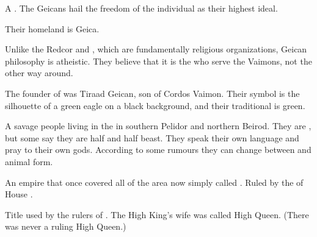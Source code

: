 \begin{gloss}
\begin{subgloss}
  \begin{comment}
  \subparagraph{Geican}
  \end{comment}
  A \VaimonClan. 
  The Geicans hail the freedom of the individual as their highest ideal. 
  
  Their homeland is Geica.
  
  Unlike the Redcor and \Telcra, which are fundamentally religious organizations, Geican philosophy is atheistic. 
  They believe that it is the \Archons{} who serve the Vaimons, not the other way around. 
  
  The founder of \ClanGeican was Tiraad Geican, son of Cordos Vaimon. 
  Their symbol is the silhouette of a green eagle on a black background, and their traditional \colour is green. 
\end{subgloss}







\begin{comment}
\paragraph{\Goyden}
\end{comment}
\gitem[\Goydens]{\Goyden}
A savage people living in the \Wylde{} in southern Pelidor and northern Beirod. They are \humans, but some say they are half \human{} and half beast. They speak their own language and pray to their own gods. According to some rumours they can change between \human{} and animal form. 









\begin{comment}
\paragraph{\GreatVelcad}
\end{comment}
\gitem{\GreatVelcad}
An empire that once covered all of the area now simply called . 
Ruled by the  of House \Velcad. 







\begin{subgloss}
  \begin{comment}
  \subparagraph{High King}
  \end{comment}
  Title used by the rulers of \GreatVelcad{}. 
  The High King's wife was called High Queen. 
  (There was never a ruling High Queen.)
\end{subgloss}















\end{gloss}
